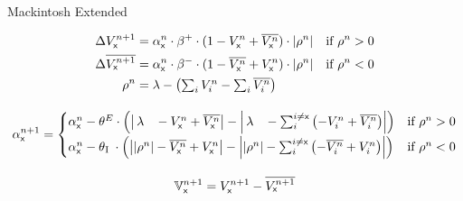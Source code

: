 \documentclass[border=10pt,varwidth=13cm]{standalone}
\begin{document}
\newcommand{\eks}{\textsf{x}}
\newcommand{\longlambda}{\rlap{$\,\lambda$}\phantom{\left| \rho^n \right|}}
\newcommand{\longI}{\rlap{\textsubscript{I}}\phantom{\textsubscript{E}}}
\newcommand{\VNet}{\mathbb{V}}

\begin{center}
	\huge
	\sffamily
	Mackintosh Extended
\end{center}
\begin{gather*}
	\begin{aligned}
		\Delta V_\eks^{n + 1} &= \alpha_\eks^n \cdot \beta^+ \cdot (1 - V_\eks^n + \overline{V_\eks^n}) \cdot \left| \rho^n \right| & \text{if } \rho^n > 0 \\
		 \Delta \overline{V_\eks^{n + 1}} &= \alpha_\eks^n \cdot \beta^- \cdot (1 - \overline{V_\eks^n} + V_\eks^n) \cdot \left| \rho^n \right| & \text{if } \rho^n < 0\\
         \rho^n &= \lambda - \left( \textstyle\sum_i V_i^n - \textstyle\sum_i \overline{V_i^n} \right) 
	\end{aligned} \\[1em]
	\alpha_\eks^{n + 1} = \begin{cases}
		\alpha^n_\eks -\theta^E \cdot \left( \left| \longlambda - V_\eks^n + \overline{V_\eks^n} \right|- \left| \longlambda - \textstyle\sum_i^{i \neq \eks} \left( - V_i^n + \overline{V_i^n} \right) \right| \right) & \text{if } \rho^n > 0 \\[1ex]
		\alpha^n_\eks -\theta\longI{} \cdot \left( \left| \left| \rho^n \right| - \overline{V_\eks^n} + V_\eks^n \right| - \left| \left| \rho^n \right| - \textstyle\sum_i^{i \neq \eks} \left( - \overline{V_i^n} + V_i^n \right) \right| \right) & \text{if } \rho^n < 0
	\end{cases} \\[1em]
	\VNet{}_\eks^{n + 1} =  V_\eks^{n + 1} - \overline{V_\eks^{n + 1}}
\end{gather*}

\nocite{LePelley2004}

\end{document}
